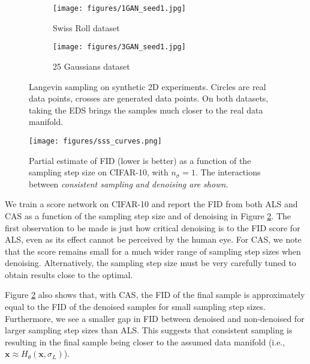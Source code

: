 \documentclass{article} \usepackage{iclr2021_conference_notitle,times}
\theoremstyle{definition}
\theoremstyle{definition}
\begin{document}
\begin{figure}[ht] 
  \begin{subfigure}[b]{0.5\linewidth}
    \centering
    \texttt{[image: figures/1GAN\_seed1.jpg]} 
    \vspace{-0.5cm}
    \caption{Swiss Roll dataset} 
  \end{subfigure}
  \begin{subfigure}[b]{0.5\linewidth}
    \centering
    \texttt{[image: figures/3GAN\_seed1.jpg]}
    \vspace{-0.5cm}
    \caption{25 Gaussians dataset} 
  \end{subfigure}
  \caption{Langevin sampling on synthetic 2D experiments. Circles are real data points, crosses are generated data points. On both datasets, taking the EDS brings the samples much closer to the real data manifold.}
  \label{fig1} 
\end{figure}

\begin{figure}[h] 
    \centering
    \texttt{[image: figures/sss\_curves.png]} 
  
\caption{Partial estimate of FID (lower is better) as a function of the sampling step size on CIFAR-10, with $n_\sigma = 1$. The interactions between \em consistent sampling \em and denoising are shown.
  }
  \label{lr_rate_cifar10} 
\end{figure}


We train a score network on CIFAR-10 \citep{krizhevsky2009learning} and report the FID from both ALS and CAS as a function of the sampling step size and of denoising in Figure \ref{lr_rate_cifar10}. The first observation to be made is just how critical denoising is to the FID score for ALS, even as its effect cannot be perceived by the human eye. For CAS, we note that the score remains small for a much wider range of sampling step sizes when denoising. Alternatively, the sampling step size must be very carefully tuned to obtain results close to the optimal. 


Figure \ref{lr_rate_cifar10} also shows that, with CAS, the FID of the final sample is approximately equal to the FID of the denoised samples for small sampling step sizes. Furthermore, we see a smaller gap in FID between denoised and non-denoised for larger sampling step sizes than ALS. This suggests that consistent sampling is resulting in the final sample being closer to the assumed data manifold (i.e., $\boldsymbol{x} \approx H_\theta(\boldsymbol{x}, \sigma_L)$).
\end{document}
